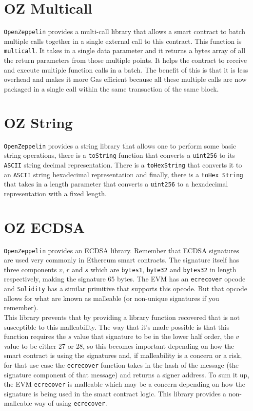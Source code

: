 \section{OZ Multicall}
\verb|OpenZeppelin| provides a multi-call library that allows a smart contract to batch multiple calls together in a single external call to this contract. This function is \verb|multicall|. It takes in a single data parameter and it returns a bytes array of all the return parameters from those multiple points. It helps the contract to receive and execute multiple function calls in a batch. The benefit of this is that it is less overhead and makes it more Gas efficient because all these multiple calls are now packaged in a single call within the same transaction of the same block.

\section{OZ String}
\verb|OpenZeppelin| provides a string library that allows one to perform some basic string operations, there is a \verb|toString| function that converts a \verb|uint256| to its \verb|ASCII| string decimal representation. There is a \verb|toHexString| that converts it to an \verb|ASCII| string hexadecimal representation and finally, there is a \verb|toHex String| that takes in a length parameter that converts a \verb|uint256| to a hexadecimal representation with a fixed length.

\section{OZ ECDSA}
\verb|OpenZeppelin| provides an ECDSA library. Remember that ECDSA signatures are used very commonly in Ethereum smart contracts. The signature itself has three components $v$, $r$ and $s$ which are \verb|bytes1|, \verb|byte32| and \verb|bytes32| in length respectively, making the signature 65 bytes. The EVM has an \verb|ecrecover| opcode and \verb|Solidity| has a similar primitive that supports this opcode. But that opcode allows for what are known as malleable (or non-unique signatures if you remember).\\

This library prevents that by providing a library function recovered that is not susceptible to this malleability. The way that it's made possible is that this function requires the $s$ value  that signature to be in the lower half order, the $v$ value to be either 27 or 28, so this becomes important depending on how the smart contract is using the signatures and, if malleability is a concern or a risk, for that use case the \verb|ecrecover| function takes in the hash of the message (the signature component of that message) and returns a signer address. To sum it up, the EVM \verb|ecrecover| is malleable which may be a concern depending on how the signature is being used in the smart contract logic. This library provides a non-malleable way of using \verb|ecrecover|.

